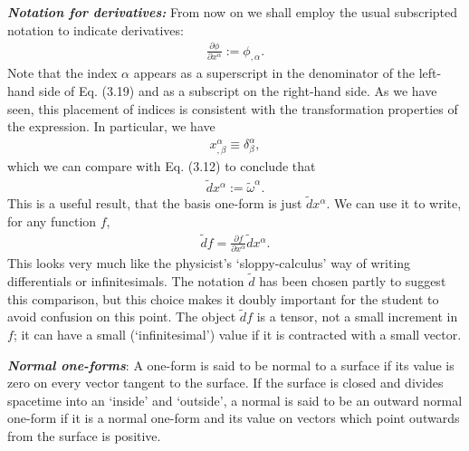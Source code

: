\documentclass[11pt,letterpaper]{book}
\begin{document}
    \textit{\textbf{Notation for derivatives:}}
    From now on we shall employ the usual subscripted notation to indicate derivatives:
    \begin{align}
    \frac{\partial \phi}{\partial x^\alpha} := \phi_{,\alpha}. \tag{3.19}
    \end{align}
    Note that the index \(\alpha\) appears as a superscript in the denominator of the left-hand side of Eq. (3.19) and as a subscript on the right-hand side. As we have seen, this placement of indices is consistent with the transformation properties of the expression. In particular, we have
    \begin{align}
    x^\alpha_{,\beta} \equiv \delta^\alpha_\beta,
    \end{align}
    which we can compare with Eq. (3.12) to conclude that
    \begin{align}
    \tilde{d}x^\alpha := \tilde{\omega}^\alpha. \tag{3.20}
    \end{align}
    This is a useful result, that the basis one-form is just \(\tilde{d}x^\alpha\). We can use it to write, for any function \(f\),
    \begin{align}
    \tilde{d}f = \frac{\partial f}{\partial x^\alpha} \tilde{d}x^\alpha.
    \end{align}
    This looks very much like the physicist’s ‘sloppy-calculus’ way of writing differentials or infinitesimals. The notation \(\tilde{d}\) has been chosen partly to suggest this comparison, but this choice makes it doubly important for the student to avoid confusion on this point. The object \(\tilde{d}f\) is a tensor, not a small increment in \(f\); it can have a small (‘infinitesimal’) value if it is contracted with a small vector.

    \textit{\textbf{Normal one-forms}}: A one-form is said to be normal to a surface if its value is zero on every vector tangent to the surface. If the surface is closed and divides spacetime into an ‘inside’ and ‘outside’, a normal is said to be an outward normal one-form if it is a normal one-form and its value on vectors which point outwards from the surface is positive.
\end{document}
